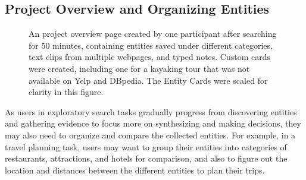 \subsection{Project Overview and Organizing Entities}

\begin{figure}
    \centering
    \caption{An project overview page created by one participant after searching for 50 minutes, containing entities saved under different categories, text clips from multiple webpages, and typed notes. Custom cards were created, including one for a kayaking tour that was not available on Yelp and DBpedia. The Entity Cards were scaled for clarity in this figure.}
    \label{fig:project}
\end{figure}


As users in exploratory search tasks gradually progress from discovering entities and gathering evidence to focus more on synthesizing and making decisions, they may also need to organize and compare the collected entities. For example, in a travel planning task, users may want to group their entities into categories of restaurants, attractions, and hotels for comparison, and also to figure out the location and distances between the different entities to plan their trips.


